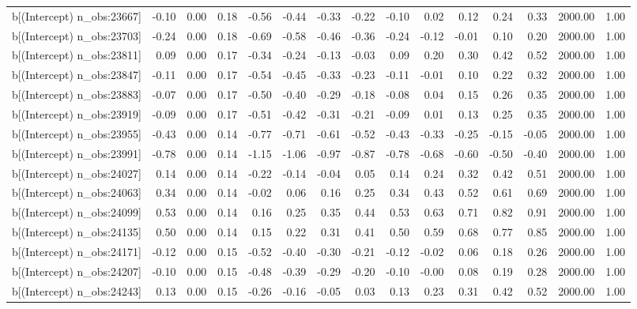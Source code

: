 \begin{table}[ht]
\begin{tabular}{rrrrrrrrrrrrrrr}
  b[(Intercept) n\_obs:23667] & -0.10 & 0.00 & 0.18 & -0.56 & -0.44 & -0.33 & -0.22 & -0.10 & 0.02 & 0.12 & 0.24 & 0.33 & 2000.00 & 1.00 \\ 
  b[(Intercept) n\_obs:23703] & -0.24 & 0.00 & 0.18 & -0.69 & -0.58 & -0.46 & -0.36 & -0.24 & -0.12 & -0.01 & 0.10 & 0.20 & 2000.00 & 1.00 \\ 
  b[(Intercept) n\_obs:23811] & 0.09 & 0.00 & 0.17 & -0.34 & -0.24 & -0.13 & -0.03 & 0.09 & 0.20 & 0.30 & 0.42 & 0.52 & 2000.00 & 1.00 \\ 
  b[(Intercept) n\_obs:23847] & -0.11 & 0.00 & 0.17 & -0.54 & -0.45 & -0.33 & -0.23 & -0.11 & -0.01 & 0.10 & 0.22 & 0.32 & 2000.00 & 1.00 \\ 
  b[(Intercept) n\_obs:23883] & -0.07 & 0.00 & 0.17 & -0.50 & -0.40 & -0.29 & -0.18 & -0.08 & 0.04 & 0.15 & 0.26 & 0.35 & 2000.00 & 1.00 \\ 
  b[(Intercept) n\_obs:23919] & -0.09 & 0.00 & 0.17 & -0.51 & -0.42 & -0.31 & -0.21 & -0.09 & 0.01 & 0.13 & 0.25 & 0.35 & 2000.00 & 1.00 \\ 
  b[(Intercept) n\_obs:23955] & -0.43 & 0.00 & 0.14 & -0.77 & -0.71 & -0.61 & -0.52 & -0.43 & -0.33 & -0.25 & -0.15 & -0.05 & 2000.00 & 1.00 \\ 
  b[(Intercept) n\_obs:23991] & -0.78 & 0.00 & 0.14 & -1.15 & -1.06 & -0.97 & -0.87 & -0.78 & -0.68 & -0.60 & -0.50 & -0.40 & 2000.00 & 1.00 \\ 
  b[(Intercept) n\_obs:24027] & 0.14 & 0.00 & 0.14 & -0.22 & -0.14 & -0.04 & 0.05 & 0.14 & 0.24 & 0.32 & 0.42 & 0.51 & 2000.00 & 1.00 \\ 
  b[(Intercept) n\_obs:24063] & 0.34 & 0.00 & 0.14 & -0.02 & 0.06 & 0.16 & 0.25 & 0.34 & 0.43 & 0.52 & 0.61 & 0.69 & 2000.00 & 1.00 \\ 
  b[(Intercept) n\_obs:24099] & 0.53 & 0.00 & 0.14 & 0.16 & 0.25 & 0.35 & 0.44 & 0.53 & 0.63 & 0.71 & 0.82 & 0.91 & 2000.00 & 1.00 \\ 
  b[(Intercept) n\_obs:24135] & 0.50 & 0.00 & 0.14 & 0.15 & 0.22 & 0.31 & 0.41 & 0.50 & 0.59 & 0.68 & 0.77 & 0.85 & 2000.00 & 1.00 \\ 
  b[(Intercept) n\_obs:24171] & -0.12 & 0.00 & 0.15 & -0.52 & -0.40 & -0.30 & -0.21 & -0.12 & -0.02 & 0.06 & 0.18 & 0.26 & 2000.00 & 1.00 \\ 
  b[(Intercept) n\_obs:24207] & -0.10 & 0.00 & 0.15 & -0.48 & -0.39 & -0.29 & -0.20 & -0.10 & -0.00 & 0.08 & 0.19 & 0.28 & 2000.00 & 1.00 \\ 
  b[(Intercept) n\_obs:24243] & 0.13 & 0.00 & 0.15 & -0.26 & -0.16 & -0.05 & 0.03 & 0.13 & 0.23 & 0.31 & 0.42 & 0.52 & 2000.00 & 1.00 \\ 

\end{tabular}
\end{table}
